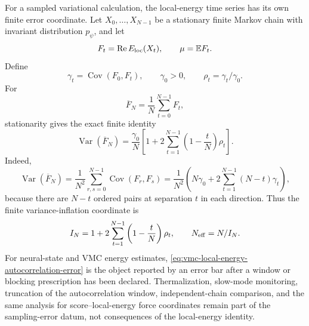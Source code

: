 For a sampled variational calculation, the local-energy time series has its own
finite error coordinate.  Let \(X_0,\ldots,X_{N-1}\) be a stationary finite
Markov chain with invariant distribution \(p_\psi\), and let
\[
  F_t=\operatorname{Re}E_{\rm loc}(X_t),\qquad
  \mu=\mathbb E F_t .
\]
Define
\[
  \gamma_t=\operatorname{Cov}(F_0,F_t),\qquad \gamma_0>0,\qquad
  \rho_t=\gamma_t/\gamma_0 .
\]
For
\[
  \overline F_N=\frac1N\sum_{t=0}^{N-1}F_t ,
\]
stationarity gives the exact finite identity
\begin{equation}
  \operatorname{Var}(\overline F_N)
  =
  \frac{\gamma_0}{N}
  \left[
    1+2\sum_{t=1}^{N-1}\left(1-\frac{t}{N}\right)\rho_t
  \right].
  \label{eq:vmc-local-energy-autocorrelation-error}
\end{equation}
Indeed,
\[
  \operatorname{Var}(\overline F_N)
  =
  \frac1{N^2}\sum_{r,s=0}^{N-1}\operatorname{Cov}(F_r,F_s)
  =
  \frac1{N^2}\left(
    N\gamma_0+2\sum_{t=1}^{N-1}(N-t)\gamma_t
  \right),
\]
because there are \(N-t\) ordered pairs at separation \(t\) in each direction.
Thus the finite variance-inflation coordinate is
\[
  I_N=1+2\sum_{t=1}^{N-1}\left(1-\frac{t}{N}\right)\rho_t,
  \qquad
  N_{\rm eff}=N/I_N .
\]
For neural-state and VMC energy estimates, \eqref{eq:vmc-local-energy-autocorrelation-error}
is the object reported by an error bar after a window or blocking prescription
has been declared.  Thermalization, slow-mode monitoring, truncation of the
autocorrelation window, independent-chain comparison, and the same analysis for
score--local-energy force coordinates remain part of the sampling-error datum,
not consequences of the local-energy identity.

